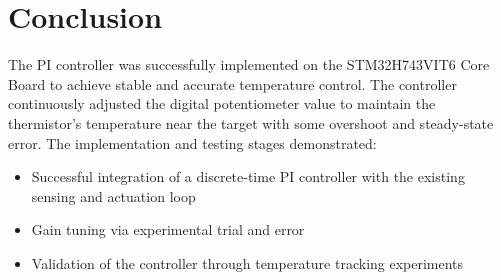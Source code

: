 \documentclass[12pt,a4paper]{article}
\begin{document}
\section{Conclusion}
The PI controller was successfully implemented on the STM32H743VIT6 Core Board to achieve stable and accurate temperature control. The controller continuously adjusted the digital potentiometer value to maintain the thermistor’s temperature near the target with some overshoot and steady-state error. The implementation and testing stages demonstrated:
\begin{itemize}
    \item Successful integration of a discrete-time PI controller with the existing sensing and actuation loop
    \item Gain tuning via experimental trial and error
    \item Validation of the controller through temperature tracking experiments
\end{itemize}
\end{document}
